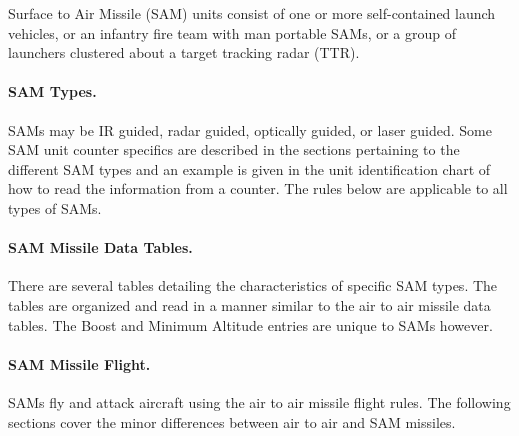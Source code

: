 




\label{rule:sams}

Surface to Air Missile (SAM) units consist of one or more self-contained launch vehicles, or an infantry fire team with man portable SAMs, or a group of launchers clustered about a target tracking radar (TTR).

\paragraph{SAM Types.} SAMs may be IR guided, radar guided, optically guided, or laser guided. Some SAM unit counter specifics are described in the sections pertaining to the different SAM types and an example is given in the unit identification chart of how to read the information from a counter. The rules below are applicable to all types of SAMs.

\paragraph{SAM Missile Data Tables.} There are several tables detailing the characteristics of specific SAM types. The tables are organized and read in a manner similar to the air to air missile data tables. The Boost and Minimum Altitude entries are unique to SAMs however.

\paragraph{SAM Missile Flight.} SAMs fly and attack aircraft using the air to air missile flight rules. The following sections cover the minor differences between air to air and SAM missiles.

